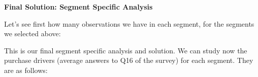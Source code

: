 \documentclass[
]{article}
\makeatletter
\def\maxheight{\ifdim\Gin@nat@height>\textheight\textheight\else\Gin@nat@height\fi}
\makeatother
\begin{document}
\textbf{Final Solution: Segment Specific Analysis}

Let's see first how many observations we have in each segment, for the
segments we selected above:

\setkeys{Gin}{height=\maxheight}

This is our final segment specific analysis and solution. We can study
now the purchase drivers (average answers to Q16 of the survey) for each
segment. They are as follows:
\end{document}
